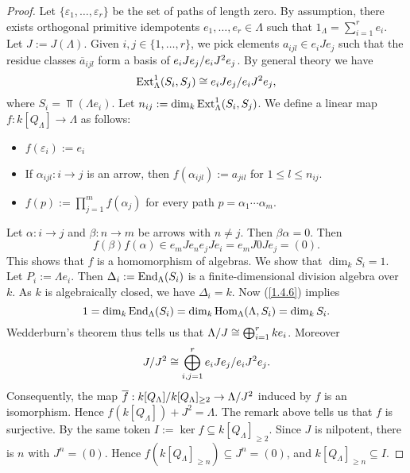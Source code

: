 \begin{proof}
  Let $\{ \varepsilon_1, \ldots, \varepsilon_r \}$ be the set of paths of length zero. By assumption,
  there exists orthogonal primitive idempotents $e_1, \ldots, e_r \in \Lambda$ such that
  $1_\Lambda = \sum_{i=1}^r e_i$. Let $J:=J(\Lambda)$. Given $i, j \in \{1, \ldots, r\}$, we pick elements $a_{ijl}
  \in e_i J e_j$ such that the residue classes $\overline a_{ijl}$ form a basis of
  $e_i J e_j/e_i J^2 e_j$. By general theory we have
    \[ \operatorname{Ext}_\Lambda^1(S_i, S_j) \cong e_i J e_j/e_i J^2 e_j, \]
  where $S_i = \Top(\Lambda e_i)$. Let $n_{ij} := \dim_k \operatorname{Ext}_\Lambda^1(S_i,
  S_j)$. We define a linear map $f: k[Q_\Lambda] \to \Lambda$ as follows:
  \begin{itemize}
  \item $f(\varepsilon_i) := e_i$
  \item If $\alpha_{ijl} : i \to j$ is an arrow, then $f(\alpha_{ijl}) := a_{jil}$ for $1 \leq
    l \leq n_{ij}$.
  \item $f(p) := \prod_{j=1}^m f(\alpha_j)$ for every path $p = \alpha_1 \cdots \alpha_m$.
  \end{itemize}

  Let $\alpha: i \to j$ and $\beta: n \to m$ be arrows with $n \neq j$. Then $\beta\alpha = 0$. Then
  \[
  f(\beta)f(\alpha)
  \in e_m J e_n e_j J e_i = e_m J 0 J e_j =(0).
  \]
  This shows that $f$ is a homomorphism of algebras. We show that $\dim_k S_i = 1$. Let $P_i := \Lambda e_i$. Then $\Delta_i
  := \operatorname{End}_\Lambda(S_i)$ is a finite-dimensional division algebra over $k$. As $k$ is
  algebraically closed, we have $\Delta_i = k$. Now (\ref{1.4.6}) implies
    \[ 1 = \dim_k \operatorname{End}_\Lambda(S_i) = \dim_k\operatorname{Hom}_\Lambda(\Lambda, S_i) = \dim_k S_i. \]
  Wedderburn's theorem thus tells us that $\Lambda/J \cong \bigoplus_{i=1}^r ke_i$.
  Moreover
  \[
  J/J^2 \cong \bigoplus_{i,j = 1}^r e_i J e_j/e_i
    J^2 e_j.
    \]
Consequently, the map $\overline{f} :
  k[Q_\Lambda]/k[Q_\Lambda]_{\geq 2} \to \Lambda/J^2$ induced by $f$ is an
  isomorphism. Hence $f(k[Q_\Lambda]) + J^2 = \Lambda$.
The remark above tells us that $f$ is surjective. By the same token $I := \ker f
  \subseteq k[Q_\Lambda]_{\geq 2}$. Since $J$ is nilpotent, there is $n$ with $J^n =
  (0)$. Hence $f(k[Q_\Lambda]_{\geq n}) \subseteq J^n = (0)$, and $k[Q_\Lambda]_{\geq n} \subseteq I$.
\end{proof}


